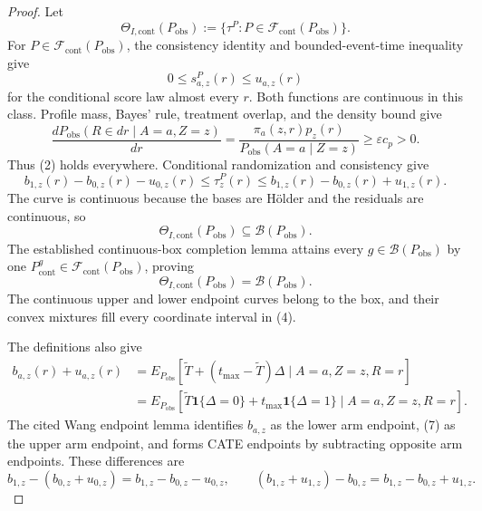 \documentclass{article}
\begin{document}
\begin{proof}
Let
\[
\Theta_{I,\mathrm{cont}}(P_{\mathrm{obs}})
:=\{\tau^P:P\in\mathcal F_{\mathrm{cont}}(P_{\mathrm{obs}})\}.
\tag{1}
\]
For \(P\in\mathcal F_{\mathrm{cont}}(P_{\mathrm{obs}})\), the consistency identity and bounded-event-time inequality give
\[
0\leq s^P_{a,z}(r)\leq u_{a,z}(r)
\tag{2}
\]
for the conditional score law almost every \(r\).  Both functions are continuous in this class.  Profile mass, Bayes' rule, treatment overlap, and the density bound give
\[
\frac{dP_{\mathrm{obs}}(R\in dr\mid A=a,Z=z)}{dr}
=\frac{\pi_a(z,r)p_z(r)}
{P_{\mathrm{obs}}(A=a\mid Z=z)}
\geq\varepsilon c_p>0.
\tag{3}
\]
Thus (2) holds everywhere.  Conditional randomization and consistency give
\[
b_{1,z}(r)-b_{0,z}(r)-u_{0,z}(r)
\leq\tau_z^P(r)\leq
b_{1,z}(r)-b_{0,z}(r)+u_{1,z}(r).
\tag{4}
\]
The curve is continuous because the bases are H\"older and the residuals are continuous, so
\[
\Theta_{I,\mathrm{cont}}(P_{\mathrm{obs}})
\subseteq\mathcal B(P_{\mathrm{obs}}).
\tag{5}
\]
The established continuous-box completion lemma attains every \(g\in\mathcal B(P_{\mathrm{obs}})\) by one \(P^g_{\mathrm{cont}}\in\mathcal F_{\mathrm{cont}}(P_{\mathrm{obs}})\), proving
\[
\Theta_{I,\mathrm{cont}}(P_{\mathrm{obs}})
=\mathcal B(P_{\mathrm{obs}}).
\tag{6}
\]
The continuous upper and lower endpoint curves belong to the box, and their convex mixtures fill every coordinate interval in (4).

The definitions also give
\[
\begin{aligned}
b_{a,z}(r)+u_{a,z}(r)
&=E_{P_{\mathrm{obs}}}
[\widetilde T+(t_{\max}-\widetilde T)\Delta
\mid A=a,Z=z,R=r]\\
&=E_{P_{\mathrm{obs}}}
[\widetilde T\mathbf 1\{\Delta=0\}
+t_{\max}\mathbf 1\{\Delta=1\}
\mid A=a,Z=z,R=r].
\end{aligned}
\tag{7}
\]
The cited Wang endpoint lemma identifies \(b_{a,z}\) as the lower arm endpoint, (7) as the upper arm endpoint, and forms CATE endpoints by subtracting opposite arm endpoints.  These differences are
\[
b_{1,z}-(b_{0,z}+u_{0,z})=b_{1,z}-b_{0,z}-u_{0,z},
\qquad
(b_{1,z}+u_{1,z})-b_{0,z}=b_{1,z}-b_{0,z}+u_{1,z}.
\tag{8}
\]


\end{proof}
\end{document}
